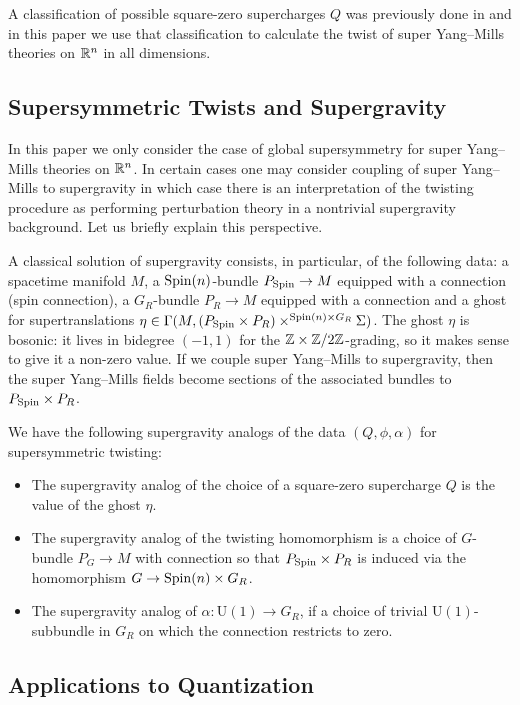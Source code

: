 \documentclass[10pt, oneside]{article}
\renewcommand{\U}{\mathrm{U}}
\begin{document}
A classification of possible square-zero supercharges $Q$ was previously done in \cite{ElliottSafronov} and in this paper we use that classification to calculate the twist of super Yang--Mills theories on $\mathbb R^n$ in all dimensions.

\subsection*{Supersymmetric Twists and Supergravity}

In this paper we only consider the case of global supersymmetry for super Yang--Mills theories on $\mathbb R^n$. In certain cases one may consider coupling of super Yang--Mills to supergravity in which case there is an interpretation of the twisting procedure as performing perturbation theory in a nontrivial supergravity background. Let us briefly explain this perspective.

A classical solution of supergravity consists, in particular, of the following data: a spacetime manifold $M$, a $\mathrm{Spin}(n)$-bundle $P_{\mathrm{Spin}}\rightarrow M$ equipped with a connection (spin connection), a $G_R$-bundle $P_R\rightarrow M$ equipped with a connection and a ghost for supertranslations $\eta\in \Gamma(M, (P_{\mathrm{Spin}}\times P_R)\times^{\mathrm{Spin}(n)\times G_R}\Sigma)$.  The ghost $\eta$ is bosonic: it lives in bidegree $(-1,1)$ for the $\mathbb Z \times \mathbb Z/2\mathbb Z$-grading, so it makes sense to give it a non-zero value.  If we couple super Yang--Mills to supergravity, then the super Yang--Mills fields become sections of the associated bundles to $P_{\mathrm{Spin}}\times P_R$.

We have the following supergravity analogs of the data $(Q, \phi, \alpha)$ for supersymmetric twisting:
\begin{itemize}
\item The supergravity analog of the choice of a square-zero supercharge $Q$ is the value of the ghost $\eta$.

\item The supergravity analog of the twisting homomorphism is a choice of $G$-bundle $P_G\rightarrow M$ with connection so that $P_{\mathrm{Spin}}\times P_R$ is induced via the homomorphism $G\rightarrow \mathrm{Spin}(n)\times G_R$.

\item The supergravity analog of $\alpha\colon \U(1)\rightarrow G_R$, if a choice of trivial $\U(1)$-subbundle in $G_R$ on which the connection restricts to zero.
\end{itemize}

\subsection*{Applications to Quantization}
\end{document}
